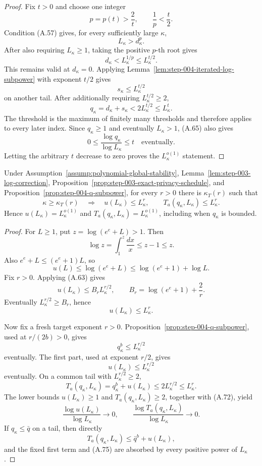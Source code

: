 \begin{proof}
Fix \(t>0\) and choose one integer
\[
p=p(t)>\frac2t,\qquad \frac1p<\frac t2.
\tag{A.66}
\]
Condition (A.57) gives, for every sufficiently large \(\kappa\),
\[
L_\kappa>d_\kappa^p.
\tag{A.67}
\]
After also requiring \(L_\kappa\geq1\), taking the positive
\(p\)-th root gives
\[
d_\kappa<L_\kappa^{1/p}
\leq L_\kappa^{t/2}.
\tag{A.68}
\]
This remains valid at \(d_\kappa=0\).  Applying
Lemma~\ref{lem:step-004-iterated-log-subpower} with exponent \(t/2\)
gives
\[
s_\kappa\leq L_\kappa^{t/2}
\tag{A.69}
\]
on another tail.  After additionally requiring
\(L_\kappa^{t/2}\geq2\),
\[
q_\kappa=d_\kappa+s_\kappa
<2L_\kappa^{t/2}
\leq L_\kappa^t.
\tag{A.70}
\]
The threshold is the maximum of finitely many thresholds and
therefore applies to every later index.  Since \(q_\kappa\geq1\) and
eventually \(L_\kappa>1\), (A.65) also gives
\[
0\leq
\frac{\log q_\kappa}{\log L_\kappa}
\leq t
\quad\text{eventually}.
\tag{A.71}
\]
Letting the arbitrary \(t\) decrease to zero proves the
\(L_\kappa^{o(1)}\) statement.
\end{proof}

\begin{lemma}
\label{lem:step-004-schedule-subpower}
Under Assumption~\ref{assump:polynomial-global-stability},
Lemma~\ref{lem:step-003-log-correction},
Proposition~\ref{prop:step-003-exact-privacy-schedule}, and
Proposition~\ref{prop:step-004-q-subpower}, for every \(r>0\) there is
\(\kappa_T(r)\) such that
\[
\kappa\geq\kappa_T(r)
\quad\Longrightarrow\quad
u(L_\kappa)\leq L_\kappa^r,\qquad
T_a(q_\kappa,L_\kappa)\leq L_\kappa^r.
\tag{A.72}
\]
Hence \(u(L_\kappa)=L_\kappa^{o(1)}\) and
\(T_a(q_\kappa,L_\kappa)=L_\kappa^{o(1)}\), including when
\(q_\kappa\) is bounded.
\end{lemma}

\begin{proof}
For \(L\geq1\), put \(z=\log(e^e+L)>1\).  Then
\[
\log z=\int_1^z\frac{dx}{x}\leq z-1\leq z.
\]
Also \(e^e+L\leq(e^e+1)L\), so
\[
u(L)
\leq\log(e^e+L)
\leq\log(e^e+1)+\log L.
\tag{A.73}
\]
Fix \(r>0\).  Applying (A.63) gives
\[
u(L_\kappa)
\leq B_rL_\kappa^{r/2},
\qquad
B_r=\log(e^e+1)+\frac2r.
\tag{A.74}
\]
Eventually \(L_\kappa^{r/2}\geq B_r\), hence
\[
u(L_\kappa)\leq L_\kappa^r.
\tag{A.75}
\]

Now fix a fresh target exponent \(r>0\).
Proposition~\ref{prop:step-004-q-subpower}, used at
\(r/(2b)>0\), gives
\[
q_\kappa^b\leq L_\kappa^{r/2}
\tag{A.76}
\]
eventually.  The first part, used at exponent \(r/2\), gives
\[
u(L_\kappa)\leq L_\kappa^{r/2}
\tag{A.77}
\]
eventually.  On a common tail with \(L_\kappa^{r/2}\geq2\),
\[
T_a(q_\kappa,L_\kappa)
=q_\kappa^b+u(L_\kappa)
\leq2L_\kappa^{r/2}
\leq L_\kappa^r.
\tag{A.78}
\]
The lower bounds \(u(L_\kappa)\geq1\) and
\(T_a(q_\kappa,L_\kappa)\geq2\), together with (A.72), yield
\[
\frac{\log u(L_\kappa)}{\log L_\kappa}\to0,\qquad
\frac{\log T_a(q_\kappa,L_\kappa)}{\log L_\kappa}\to0.
\tag{A.79}
\]
If \(q_\kappa\leq\bar q\) on a tail, then directly
\[
T_a(q_\kappa,L_\kappa)
\leq\bar q^b+u(L_\kappa),
\tag{A.80}
\]
and the fixed first term and (A.75) are absorbed by every positive
power of \(L_\kappa\).
\end{proof}

